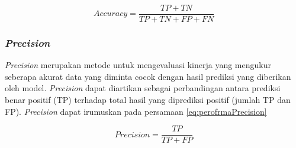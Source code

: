 \begin{equation}
    \label{eq:perofrmaAccuracy}
    Accuracy = \frac{TP + TN}{TP + TN + FP + FN}
\end{equation}

\subsubsection{\textit{Precision}}
\textit{Precision} merupakan metode untuk mengevaluasi kinerja yang mengukur seberapa akurat data yang diminta cocok dengan hasil prediksi yang diberikan oleh model. \textit{Precision} dapat diartikan sebagai perbandingan antara prediksi benar positif (TP) terhadap total hasil yang diprediksi positif (jumlah TP dan FP). \textit{Precision} dapat irumuskan pada persamaan \ref{eq:perofrmaPrecision} \parencite{OvalleMagallanes2020}

\begin{equation}
    \label{eq:perofrmaPrecision}
    Precision = \frac{TP}{TP + FP}
\end{equation}

